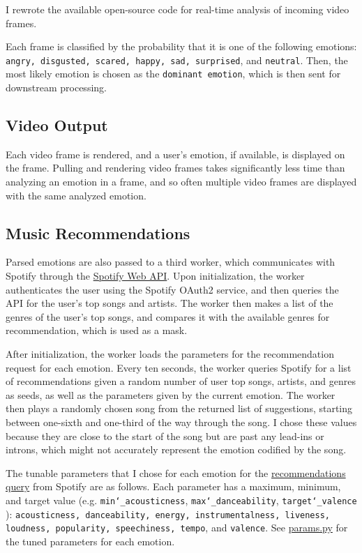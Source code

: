 \documentclass{article}
\renewcommand{\_}[1]{\underline{ #1 }}
\theoremstyle{definition}
\begin{document}
I rewrote the available open-source code for real-time analysis of incoming video frames. 

Each frame is classified by the probability that it is one of the following emotions: \texttt{angry, disgusted, scared, happy, sad, surprised}, and \texttt{neutral}. Then, the most likely emotion is chosen as the \texttt{dominant emotion}, which is then sent for downstream processing.

\subsection[Video Output]{Video Output}

Each video frame is rendered, and a user's emotion, if available, is displayed on the frame. Pulling and rendering video frames takes significantly less time than analyzing an emotion in a frame, and so often multiple video frames are displayed with the same analyzed emotion.

\subsection[Music Recommendations]{Music Recommendations}

Parsed emotions are also passed to a third worker, which communicates with Spotify through the \href{https://developer.spotify.com/documentation/web-api/}{Spotify Web API}. Upon initialization, the worker authenticates the user using the Spotify OAuth2 service, and then queries the API for the user's top songs and artists. The worker then makes a list of the genres of the user's top songs, and compares it with the available genres for recommendation, which is used as a mask. 

After initialization, the worker loads the parameters for the recommendation request for each emotion. Every ten seconds, the worker queries Spotify for a list of recommendations given a random number of user top songs, artists, and genres as seeds, as well as the parameters given by the current emotion. The worker then plays a randomly chosen song from the returned list of suggestions, starting between one-sixth and one-third of the way through the song. I chose these values because they are close to the start of the song but are past any lead-ins or introns, which might not accurately represent the emotion codified by the song.

The tunable parameters that I chose for each emotion for the \href{https://developer.spotify.com/documentation/web-api/reference/#/operations/get-recommendationsrecommendation}{recommendations query} from Spotify are as follows. Each parameter has a maximum, minimum, and target value (e.g. \texttt{min\char`_acousticness}, \texttt{max\char`_danceability}, \texttt{target\char`_valence} ): \texttt{acousticness, danceability, energy, instrumentalness, liveness, loudness, popularity, speechiness, tempo}, and \texttt{valence}. See \href{https://github.com/as4mo3/face-the-music/blob/master/params.py}{params.py} for the tuned parameters for each emotion.
\end{document}
